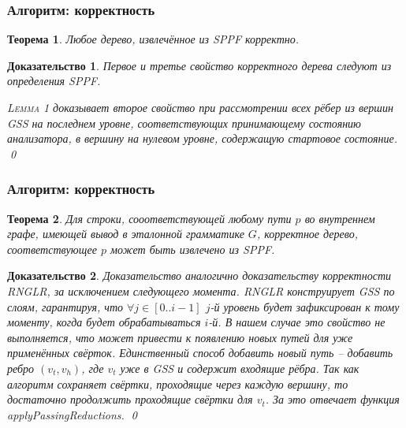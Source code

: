 \documentclass{beamer}
\newtheorem{rutheorem}{Теорема}
\newtheorem{ruproof}{Доказательство}
\begin{document}
\begin{frame}
    \transwipe[direction=90]
    \frametitle{Алгоритм: корректность}
    \begin{rutheorem}
       Любое дерево, извлечённое из SPPF корректно.
    \end{rutheorem}

    \begin{ruproof}
      Первое и третье свойство корректного дерева следуют из определения SPPF. 

      \textsc{Lemma 1} доказывает второе свойство при рассмотрении всех рёбер из вершин GSS на последнем уровне, соответствующих принимающему состоянию анализатора, в вершину на 
      нулевом уровне, содержащую стартовое состояние.
      \qed
    \end{ruproof}

\end{frame}

\begin{frame}
    \transwipe[direction=90]
    \frametitle{Алгоритм: корректность}
    \begin{rutheorem}
      Для строки, сооответствующей любому пути $p$ во внутреннем графе, имеющей вывод в эталонной грамматике $G$, корректное дерево, соответствующее $p$ может быть извлечено из SPPF.
    \end{rutheorem}

    \begin{ruproof}
Доказательство аналогично доказательству корректности RNGLR, за исключением следующего момента. RNGLR конструирует GSS по слоям, гарантируя, что $\forall j \in [0..i-1]$ $j$-й уровень будет зафиксирован к тому 
моменту, когда будет обрабатываться $i$-й. В нашем случае это свойство не выполняется, что может привести к появлению новых путей для уже применённых свёрток. Единственный способ добавить новый путь --
добавить ребро $(v_{t}, v_{h})$, где $v_{t}$ уже в GSS и содержит входящие рёбра. Так как алгоритм сохраняет свёртки, проходящие через каждую вершину, то достаточно продолжить проходящие свёртки 
для $v_{t}$. За это отвечает функция \emph{applyPassingReductions}.
\qed
    \end{ruproof}

\end{frame}
\end{document}
